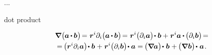 ...

 dot product 

\nopagebreak\vspace{-0.4em}\begin{multline}\label{gradientofdotproductoftwovectors}
\boldnabla \hspace{.1ex} \bigl( \hspace{-0.05ex} \bm{a} \hspace{-0.1ex} \dotp \hspace{-0.1ex} \bm{b} \hspace{.05ex} \bigr) \hspace{-0.3ex}
= \hspace{.1ex} \locationvector^i \partial_i \bigl( \hspace{-0.05ex} \bm{a} \hspace{-0.1ex} \dotp \hspace{-0.1ex} \bm{b} \hspace{.05ex} \bigr) \hspace{-0.33ex}
= \hspace{.1ex} \locationvector^i \bigl( \partial_i \bm{a} \bigr) \hspace{-0.32ex} \dotp \bm{b} + \hspace{.1ex} \locationvector^i \bm{a} \hspace{-0.05ex} \dotp \hspace{-0.15ex} \bigl( \partial_i \bm{b} \bigr) \hspace{-0.33ex} =
\\[-0.1em]
%
= \hspace{-0.2ex} \bigl( \locationvector^i \partial_i \bm{a} \bigr) \hspace{-0.32ex} \dotp \bm{b} \hspace{.1ex} + \hspace{.1ex} \locationvector^i \bigl( \partial_i \bm{b} \bigr) \hspace{-0.33ex} \dotp \bm{a}
= \hspace{-0.16ex} \bigl( \boldnabla \hspace{-0.1ex} \bm{a} \bigr) \hspace{-0.3ex} \dotp \hspace{.1ex} \bm{b} \hspace{.1ex} + \hspace{-0.1ex} \bigl( \boldnabla \hspace{.1ex} \bm{b} \bigr) \hspace{-0.27ex} \dotp \hspace{.1ex} \bm{a}
\hspace{.2ex} .
\end{multline}


